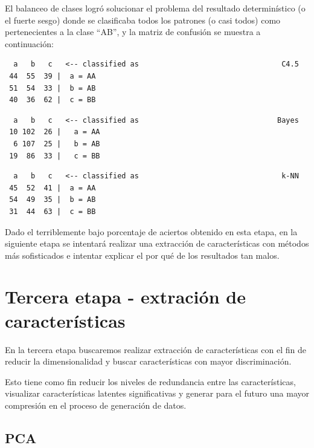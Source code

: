 \documentclass[12pt,a4paper,titlepage]{report}
\begin{document}
El balanceo de clases logró solucionar el problema del resultado determinístico (o el fuerte sesgo) donde se clasificaba todos los patrones (o casi todos) como pertenecientes a la clase ``AB'', y la matriz de confusión se muestra a continuación:
\vspace{-10pt}
\begin{lstlisting}
  a   b   c   <-- classified as									C4.5   
 44  55  39 |  a = AA
 51  54  33 |  b = AB
 40  36  62 |  c = BB
\end{lstlisting}
\vspace{-1cm}
\begin{lstlisting}
  a   b   c   <-- classified as								   Bayes
 10 102  26 |   a = AA
  6 107  25 |   b = AB
 19  86  33 |   c = BB
\end{lstlisting}
\vspace{-1cm}
\begin{lstlisting}
  a   b   c   <-- classified as									k-NN
 45  52  41 |  a = AA
 54  49  35 |  b = AB
 31  44  63 |  c = BB
\end{lstlisting}

Dado el terriblemente bajo porcentaje de aciertos obtenido en esta etapa, en la siguiente etapa se intentará realizar una extracción de características con métodos más sofisticados e intentar explicar el por qué de los resultados tan malos.

\section{Tercera etapa - extración de características}

En la tercera etapa buscaremos realizar extracción de características con el fin de reducir la dimensionalidad y  buscar características con mayor discriminación. 

Esto tiene como fin reducir los niveles de redundancia entre las características, visualizar características latentes significativas y generar para el futuro una mayor compresión en el proceso de generación de datos. 

\subsection{PCA}
\end{document}
